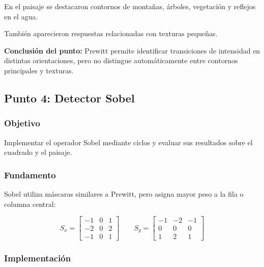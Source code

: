 \documentclass[11pt,letterpaper]{article}
\begin{document}
En el paisaje se destacaron contornos
de montañas, árboles, vegetación
y reflejos en el agua.

También aparecieron respuestas
relacionadas con texturas pequeñas.

\textbf{Conclusión del punto:}
Prewitt permite identificar transiciones
de intensidad en distintas orientaciones,
pero no distingue automáticamente
entre contornos principales y texturas.

\subsection{Punto 4: Detector Sobel}

\subsubsection*{Objetivo}

Implementar el operador Sobel mediante
ciclos y evaluar sus resultados
sobre el cuadrado y el paisaje.

\subsubsection*{Fundamento}

Sobel utiliza máscaras similares
a Prewitt, pero asigna mayor peso
a la fila o columna central:

\[
S_x=
\begin{bmatrix}
-1&0&1\\
-2&0&2\\
-1&0&1
\end{bmatrix}
\qquad
S_y=
\begin{bmatrix}
-1&-2&-1\\
0&0&0\\
1&2&1
\end{bmatrix}
\]

\subsubsection*{Implementación}
\end{document}
